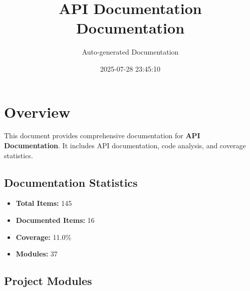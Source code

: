 \documentclass[11pt,a4paper]{article}
\title{API Documentation\\Documentation}
\author{Auto-generated Documentation}
\date{2025-07-28 23:45:10}
\begin{document}
\maketitle
\thispagestyle{empty}

\newpage
\tableofcontents
\newpage

\section{Overview}

This document provides comprehensive documentation for \textbf{API Documentation}. It includes API documentation, code analysis, and coverage statistics.

\subsection{Documentation Statistics}

\begin{itemize}
    \item \textbf{Total Items:} 145
    \item \textbf{Documented Items:} 16
    \item \textbf{Coverage:} 11.0\%
    \item \textbf{Modules:} 37
\end{itemize}

\subsection{Project Modules}
\end{document}
